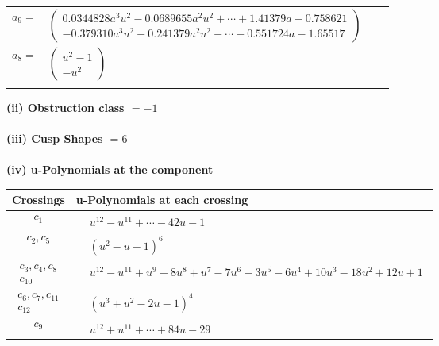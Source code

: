 \documentclass[1p]{elsarticle_modified}
\theoremstyle{definition}
\begin{document}
\begin{tabular}{m{7pt} m{180pt} m{7pt} m{180pt} }
\flushright $a_{9}=$&$\begin{pmatrix}0.0344828 a^{3} u^{2}-0.0689655 a^{2} u^{2}+\cdots+1.41379 a-0.758621\\-0.379310 a^{3} u^{2}-0.241379 a^{2} u^{2}+\cdots-0.551724 a-1.65517\end{pmatrix}$ \\
\flushright $a_{8}=$&$\begin{pmatrix}u^2-1\\- u^2\end{pmatrix}$\\&\end{tabular}
\flushleft \textbf{(ii) Obstruction class $= -1$}\\~\\
\flushleft \textbf{(iii) Cusp Shapes $= 6$}\\~\\
\newpage\renewcommand{\arraystretch}{1}
\flushleft \textbf{(iv) u-Polynomials at the component}\newline \\
\begin{tabular}{m{50pt}|m{274pt}}
Crossings & \hspace{64pt}u-Polynomials at each crossing \\
\hline $$\begin{aligned}c_{1}\end{aligned}$$&$\begin{aligned}
&u^{12}- u^{11}+\cdots-42 u-1
\end{aligned}$\\
\hline $$\begin{aligned}c_{2},c_{5}\end{aligned}$$&$\begin{aligned}
&(u^2- u-1)^6
\end{aligned}$\\
\hline $$\begin{aligned}c_{3},c_{4},c_{8}\\c_{10}\end{aligned}$$&$\begin{aligned}
&u^{12}- u^{11}+u^9+8 u^8+u^7-7 u^6-3 u^5-6 u^4+10 u^3-18 u^2+12 u+1
\end{aligned}$\\
\hline $$\begin{aligned}c_{6},c_{7},c_{11}\\c_{12}\end{aligned}$$&$\begin{aligned}
&(u^3+u^2-2 u-1)^4
\end{aligned}$\\
\hline $$\begin{aligned}c_{9}\end{aligned}$$&$\begin{aligned}
&u^{12}+u^{11}+\cdots+84 u-29
\end{aligned}$\\
\hline
\end{tabular}\\~\\
\end{document}

